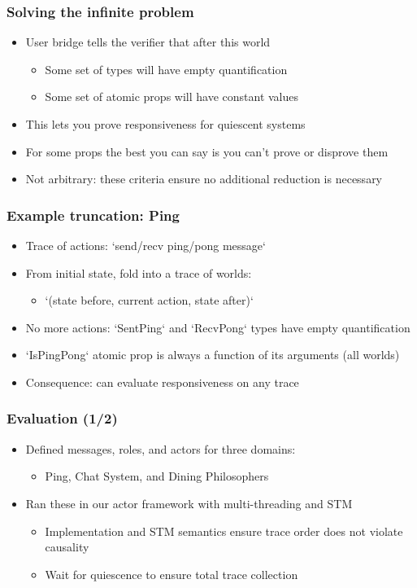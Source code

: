 \documentclass{beamer}
\begin{document}
\begin{frame}
\frametitle{Solving the infinite problem}
\begin{itemize}
  \item User bridge tells the verifier that after this world
  \begin{itemize}
    \item Some set of types will have empty quantification
    \item Some set of atomic props will have constant values
  \end{itemize}
  \item This lets you prove responsiveness for quiescent systems
  \item For some props the best you can say is you can't prove or disprove them
  \item Not arbitrary: these criteria ensure no additional reduction is necessary
\end{itemize}
\end{frame}

\begin{frame}
\frametitle{Example truncation: Ping}
\begin{itemize}
  \item Trace of actions: `send/recv ping/pong message`
  \item From initial state, fold into a trace of worlds:
  \begin{itemize}
    \item `(state before, current action, state after)`
  \end{itemize}
  \item No more actions: `SentPing` and `RecvPong` types have empty quantification
  \item `IsPingPong` atomic prop is always a function of its arguments (all worlds)
  \item Consequence: can evaluate responsiveness on any trace
\end{itemize}
\end{frame}

\begin{frame}
\frametitle{Evaluation (1/2)}
\begin{itemize}
  \item Defined messages, roles, and actors for three domains:
  \begin{itemize}
    \item Ping, Chat System, and Dining Philosophers
  \end{itemize}
  \item Ran these in our actor framework with multi-threading and STM
  \begin{itemize}
    \item Implementation and STM semantics ensure trace order does not violate causality
    \item Wait for quiescence to ensure total trace collection
  \end{itemize}
\end{itemize}
\end{frame}
\end{document}
